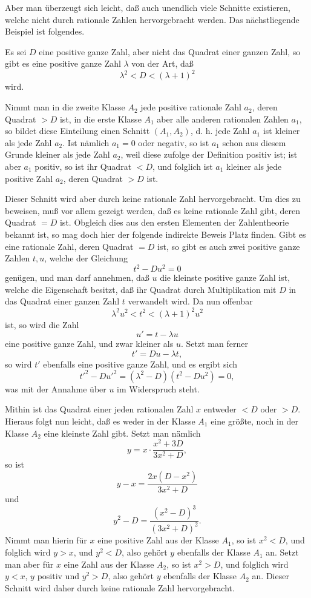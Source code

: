\documentclass[11pt]{article}
\begin{document}
Aber man überzeugt sich leicht, daß auch unendlich viele Schnitte existieren, welche nicht durch rationale Zahlen hervorgebracht werden. Das nächstliegende Beispiel ist folgendes.

Es sei $D$ eine positive ganze Zahl, aber nicht das Quadrat einer ganzen Zahl, so gibt es eine positive ganze Zahl $\lambda$ von der Art, daß
\[
\lambda^2<D<(\lambda+1)^2
\]
wird.

Nimmt man in die zweite Klasse $A_2$ jede positive rationale Zahl $a_2$, deren Quadrat $>D$ ist, in die erste Klasse $A_1$ aber alle anderen rationalen Zahlen $a_1$, so bildet diese Einteilung einen Schnitt $(A_1,A_2)$, d. h. jede Zahl $a_1$ ist kleiner als jede Zahl $a_2$. Ist nämlich $a_1=0$ oder negativ, so ist $a_1$ schon aus diesem Grunde kleiner als jede Zahl $a_2$, weil diese zufolge der Definition positiv ist; ist aber $a_1$ positiv, so ist ihr Quadrat $<D$, und folglich ist $a_1$ kleiner als jede positive Zahl $a_2$, deren Quadrat $>D$ ist.

Dieser Schnitt wird aber durch keine rationale Zahl hervorgebracht. Um dies zu beweisen, muß vor allem gezeigt werden, daß es keine rationale Zahl gibt, deren Quadrat $=D$ ist. Obgleich dies aus den ersten Elementen der Zahlentheorie bekannt ist, so mag doch hier der folgende indirekte Beweis Platz finden. Gibt es eine rationale Zahl, deren Quadrat $=D$ ist, so gibt es auch zwei positive ganze Zahlen $t,u$, welche der Gleichung
\[
t^2-Du^2=0
\]
genügen, und man darf annehmen, daß $u$ die kleinste positive ganze Zahl ist, welche die Eigenschaft besitzt, daß ihr Quadrat durch Multiplikation mit $D$ in das Quadrat einer ganzen Zahl $t$ verwandelt wird. Da nun offenbar
\[
\lambda^2u^2<t^2<(\lambda+1)^2u^2
\]
ist, so wird die Zahl
\[
u'=t-\lambda u
\]
eine positive ganze Zahl, und zwar kleiner als $u$. Setzt man ferner
\[
t'=Du-\lambda t,
\]
so wird $t'$ ebenfalls eine positive ganze Zahl, und es ergibt sich
\[
t'^2-Du'^2=(\lambda^2-D)(t^2-Du^2)=0,
\]
was mit der Annahme über $u$ im Widerspruch steht.

Mithin ist das Quadrat einer jeden rationalen Zahl $x$ entweder $<D$ oder $>D$. Hieraus folgt nun leicht, daß es weder in der Klasse $A_1$ eine größte, noch in der Klasse $A_2$ eine kleinste Zahl gibt. Setzt man nämlich
\[
y=x\cdot \frac{x^2+3D}{3x^2+D},
\]
so ist
\[
y-x=\frac{2x(D-x^2)}{3x^2+D}
\]
und
\[
y^2-D=\frac{(x^2-D)^3}{(3x^2+D)^2}.
\]
Nimmt man hierin für $x$ eine positive Zahl aus der Klasse $A_1$, so ist $x^2<D$, und folglich wird $y>x$, und $y^2<D$, also gehört $y$ ebenfalls der Klasse $A_1$ an. Setzt man aber für $x$ eine Zahl aus der Klasse $A_2$, so ist $x^2>D$, und folglich wird $y<x$, $y$ positiv und $y^2>D$, also gehört $y$ ebenfalls der Klasse $A_2$ an. Dieser Schnitt wird daher durch keine rationale Zahl hervorgebracht.
\end{document}
